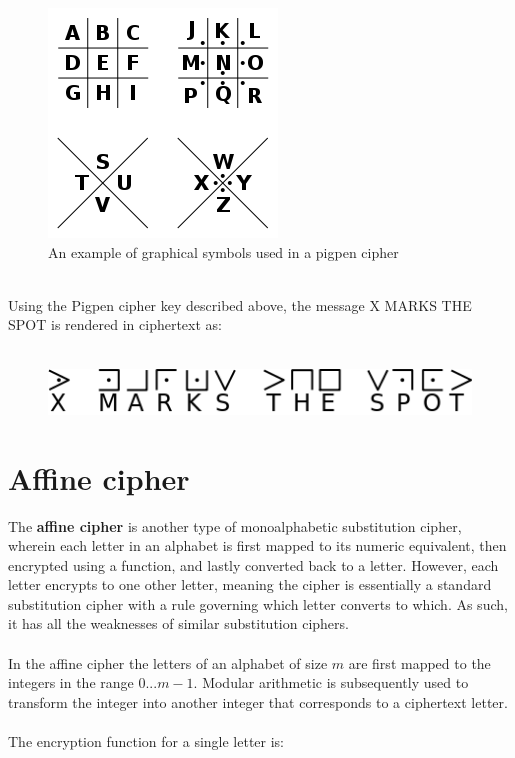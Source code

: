 \documentclass[Lau,binding=0.6cm,oneside]{sapthesis}
\begin{document}
\begin{figure}[h]
\includegraphics[scale=0.4]{pigpen}
\centering
\caption{An example of graphical symbols used in a pigpen cipher}
\centering
\end{figure}
\ \\
Using the Pigpen cipher key described above, the message \textsf{X MARKS THE SPOT} is rendered in ciphertext as:\\\\

\begin{figure}[h]
\includegraphics[scale=0.7]{xmarksthespot}
\centering
\caption{}
\centering
\end{figure}

\section{Affine cipher}
The \textbf{affine cipher} is another type of monoalphabetic substitution cipher, wherein each letter in an alphabet is first mapped to its numeric equivalent, then encrypted using a function, and lastly converted back to a letter. However, each letter encrypts to one other letter, meaning the cipher is essentially a standard substitution cipher with a rule governing which letter converts to which. As such, it has all the weaknesses of similar substitution ciphers\supercite{affine}.\\\\
In the affine cipher the letters of an alphabet of size $m$ are first mapped to the integers in the range $0 ... m-1$. Modular arithmetic is subsequently used to transform the integer into another integer that corresponds to a ciphertext letter.\\\\ The encryption function for a single letter is:
\end{document}
